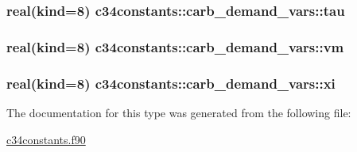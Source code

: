 \subsubsection[{\texorpdfstring{tau}{tau}}]{\setlength{\rightskip}{0pt plus 5cm}real(kind=8) c34constants\+::carb\+\_\+demand\+\_\+vars\+::tau}\hypertarget{structc34constants_1_1carb__demand__vars_ae138efc2c2eea80bf2149de470db7558}{}\label{structc34constants_1_1carb__demand__vars_ae138efc2c2eea80bf2149de470db7558}
\subsubsection[{\texorpdfstring{vm}{vm}}]{\setlength{\rightskip}{0pt plus 5cm}real(kind=8) c34constants\+::carb\+\_\+demand\+\_\+vars\+::vm}\hypertarget{structc34constants_1_1carb__demand__vars_a64dcbcdfb1d4617b3a9c99f1657ec258}{}\label{structc34constants_1_1carb__demand__vars_a64dcbcdfb1d4617b3a9c99f1657ec258}
\subsubsection[{\texorpdfstring{xi}{xi}}]{\setlength{\rightskip}{0pt plus 5cm}real(kind=8) c34constants\+::carb\+\_\+demand\+\_\+vars\+::xi}\hypertarget{structc34constants_1_1carb__demand__vars_afc5690ea0d855cce412210903bf987d7}{}\label{structc34constants_1_1carb__demand__vars_afc5690ea0d855cce412210903bf987d7}


The documentation for this type was generated from the following file\+:\begin{DoxyCompactItemize}
\item 
\hyperlink{c34constants_8f90}{c34constants.\+f90}\end{DoxyCompactItemize}
